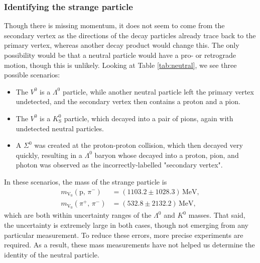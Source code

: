 \documentclass[twocolumn]{article}
\begin{document}
\subsubsection{Identifying the strange particle}
Though there is missing momentum, it does not seem to come from the secondary vertex as the directions of the decay particles already trace back to the primary vertex, whereas another decay product would change this. The only possibility would be that a neutral particle would have a pro- or retrograde motion, though this is unlikely. Looking at Table \ref{tab:neutral}, we see three possible scenarios:
\begin{itemize}
	\item The $V^0$ is a $\Lambda^0$ particle, while another neutral particle left the primary vertex undetected, and the secondary vertex then contains a proton and a pion.
	\item The $V^0$ is a $K^0_{\text{S}}$ particle, which decayed into a pair of pions, again with undetected neutral particles.
	\item A $\Sigma^0$ was created at the proton-proton collision, which then decayed very quickly, resulting in a $\Lambda^0$ baryon whose decayed into a proton, pion, and photon was observed as the incorrectly-labelled "secondary vertex".
\end{itemize}
In these scenarios, the mass of the strange particle is
\begin{align*}
m_{\text{V}_0} ( \text{p}, \, \pi^-) &= (1103.2 \pm 1028.3)\, \text{MeV},\\
m_{\text{V}_0} ( \pi^+, \, \pi^- ) &= (532.8 \pm 2132.2)\, \text{MeV},
\end{align*}
which are both within uncertainty ranges of the $\Lambda^0$ and $K^0$ masses. That said, the uncertainty is extremely large in both cases, though not emerging from any particular measurement. To reduce these errors, more precise experiments are required. As a result, these mass measurements have not helped us determine the identity of the neutral particle.
\end{document}
